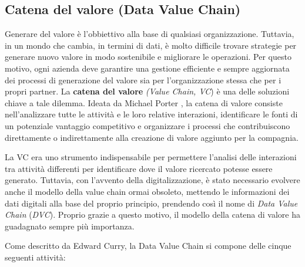 \subsection{Catena del valore (Data Value Chain)}
Generare del valore è l’obbiettivo alla base di qualsiasi organizzazione. Tuttavia, in un mondo che cambia, in termini di dati, è molto difficile trovare strategie per generare nuovo valore in modo sostenibile e migliorare le operazioni. Per questo motivo, ogni azienda deve garantire una gestione efficiente e sempre aggiornata dei processi di generazione del valore sia per l’organizzazione stessa che per i propri partner. La \textbf{catena del valore} \textit{(Value Chain, VC}) è una delle soluzioni chiave a tale dilemma.\cite{springer_big_data_value_chain}
Ideata da Michael Porter\cite{porter_big_data_value_chain}
, la catena di valore consiste nell’analizzare tutte le attività e le loro relative interazioni, identificare le fonti di un potenziale vantaggio competitivo e organizzare i processi che contribuiscono direttamente o indirettamente alla creazione di valore aggiunto per la compagnia.\cite{wiley_big_data_value_chain}

La VC era uno strumento indispensabile per permettere l’analisi delle interazioni tra attività differenti per identificare dove il valore ricercato potesse essere generato. Tuttavia, con l’avvento della digitalizzazione, è stato necessario evolvere anche il modello della value chain ormai obsoleto, mettendo le informazioni dei dati digitali alla base del proprio principio, prendendo così il nome di \textit{Data Value Chain} (\textit{DVC}).\cite{core_data_value_chain} Proprio grazie a questo motivo, il modello della catena di valore ha guadagnato sempre più importanza.

Come descritto da Edward Curry, la Data Value Chain si compone delle cinque seguenti attività\cite{curry_data_value_chain}:

